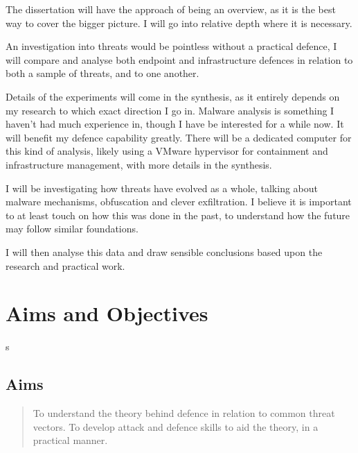 The dissertation will have the approach of being an overview, as it is the best way to cover the bigger picture. 
I will go into relative depth where it is necessary. 

An investigation into threats would be pointless without a practical defence, 
I will compare and analyse both endpoint and infrastructure defences in relation to both a sample of threats, and to one another. 

Details of the experiments will come in the synthesis, as it entirely depends on my research to which exact direction I go in. 
Malware analysis is something I haven't had much experience in, though I have be interested for a while now. It will benefit my defence capability greatly.
There will be a dedicated computer for this kind of analysis, likely using a VMware hypervisor for containment and infrastructure management, with more details in the synthesis.

I will be investigating how threats have evolved as a whole, talking about malware mechanisms, obfuscation and clever exfiltration. 
I believe it is important to at least touch on how this was done in the past, to understand how the future may follow similar foundations. 

I will then analyse this data and draw sensible conclusions based upon the research and practical work.
\section{Aims and Objectives}s
\subsection{Aims}
\begin{quote}
	To understand the theory behind defence in relation to common threat vectors.
	To develop attack and defence skills to aid the theory, in a practical manner.
\end{quote}

